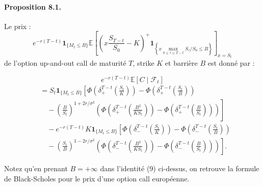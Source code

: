 \documentclass[11pt]{article}
\begin{document}
\paragraph{Proposition 8.1.}Le prix : 
\begin{equation}
e^{-r(T-t)} \mathbf{1}_{\{M_t \le B\}} \mathbb{E} \left[ \left( x \frac{S_{T-t}}{S_0} - K \right)^+ \mathbf{1}_{\left\{ x \max_{0 \le \tau \le T-t} S_\tau / S_0 \le B \right\}} \right]_{x=S_t}
\end{equation}
de l'option up-and-out call de maturité $T$, strike $K$ et barrière $B$ est donné par :

\begin{equation}
e^{-r(T-t)} \mathbb{E} \left[ C \mid \mathcal{F}_t \right]
\end{equation}
\begin{align*}
&= S_t \mathbf{1}_{\{M_t \le B\}} \left[ \Phi \left( \delta_+^{T-t} \left( \frac{S_t}{K} \right) \right) - \Phi \left( \delta_+^{T-t} \left( \frac{S_t}{B} \right) \right) \right. \\
&\quad - \left. \left( \frac{B}{S_t} \right)^{1+2r/\sigma^2} \left( \Phi \left( \delta_+^{T-t} \left( \frac{B^2}{KS_t} \right) \right) - \Phi \left( \delta_+^{T-t} \left( \frac{B}{S_t} \right) \right) \right) \right] \\
&\quad - e^{-r(T-t)} K \mathbf{1}_{\{M_t \le B\}} \left[ \Phi \left( \delta_-^{T-t} \left( \frac{S_t}{K} \right) \right) - \Phi \left( \delta_-^{T-t} \left( \frac{S_t}{B} \right) \right) \right. \\
&\quad - \left. \left( \frac{S_t}{B} \right)^{1-2r/\sigma^2} \left( \Phi \left( \delta_-^{T-t} \left( \frac{B^2}{KS_t} \right) \right) - \Phi \left( \delta_-^{T-t} \left( \frac{B}{S_t} \right) \right) \right) \right].
\end{align*}

Notez qu'en prenant $B = +\infty$ dans l'identité (9) ci-dessus, on retrouve la formule de Black-Scholes pour le prix d'une option call européenne.
\end{document}
